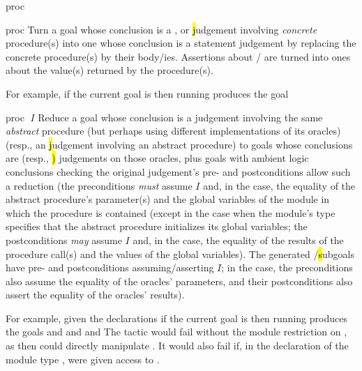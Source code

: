 \begin{tactic}{proc}
  \begin{tsyntax}{proc}
    Turn a goal whose conclusion is a \prhl, \phl or \hl judgement
    involving \emph{concrete} procedure(s) into one whose conclusion
    is a statement judgement by replacing the concrete procedure(s) by
    their body/ies. Assertions about / are turned
    into ones about the value(s) returned by the procedure(s).

  \bigskip
  For example, if the current goal is
   then
  running 
  produces the goal
  \end{tsyntax}

  \begin{tsyntax}{proc $\;I$}
    Reduce a goal whose conclusion is a \prhl judgement involving the
    same \emph{abstract} procedure (but perhaps using different
    implementations of its oracles) (resp., an \hl judgement involving
    an abstract procedure) to goals whose conclusions are \prhl (resp.,
    \hl) judgements on those oracles, plus goals with ambient logic
    conclusions checking the original judgement's pre- and
    postconditions allow such a reduction (the preconditions
    \emph{must} assume $I$ and, in the \prhl case, the equality of the
    abstract procedure's parameter(s) and the global variables of the
    module in which the procedure is contained (except in the case
    when the module's type specifies that the abstract procedure
    initializes its global variables; the postconditions \emph{may}
    assume $I$ and, in the \prhl case, the equality of the results of
    the procedure call(s) and the values of the global variables). The
    generated \prhl/\hl subgoals have pre- and postconditions
    assuming/asserting $I$; in the \prhl case, the preconditions also
    assume the equality of the oracles' parameters, and their
    postconditions also assert the equality of the oracles' results).

  \bigskip
  For example, given the declarations
  if the current goal is
   then
  running 
  produces the goals
  and
  and
  and
  The tactic would fail without the module restriction  on
  , as then  could directly manipulate .
  It would also fail if, in the declaration of the module type ,
   were given access to .
  \end{tsyntax}


\end{tactic}

